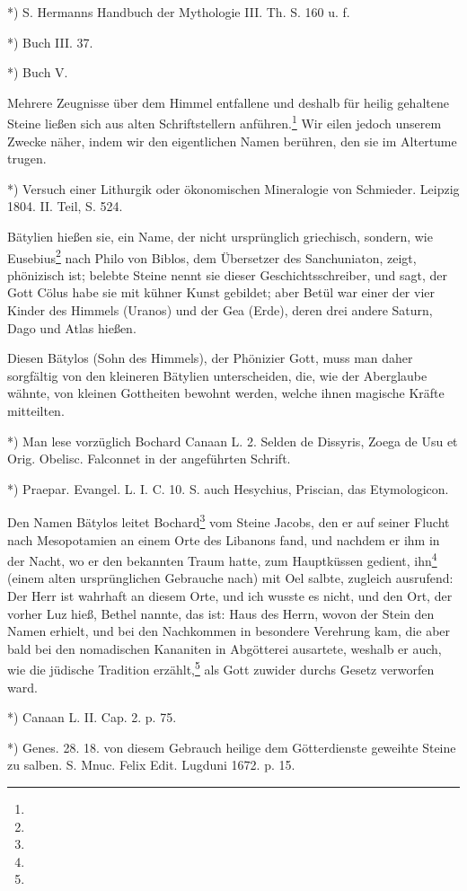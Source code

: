 \documentclass[a4paper, 11pt, oneside, polutonikogreek, german]{article}
\begin{document}
*) S. Hermanns Handbuch der Mythologie III. Th. S. 160 u. f.

*) Buch III. 37.

*) Buch V.

Mehrere Zeugnisse über dem Himmel entfallene und deshalb für heilig gehaltene Steine ließen sich aus alten Schriftstellern anführen.\footnote{} Wir eilen jedoch unserem Zwecke näher, indem wir den eigentlichen Namen berühren, den sie im Altertume trugen.

*) Versuch einer Lithurgik oder ökonomischen Mineralogie von Schmieder. Leipzig 1804. II. Teil, S. 524.

Bätylien hießen sie, ein Name, der nicht ursprünglich griechisch, sondern, wie Eusebius\footnote{} nach Philo von Biblos, dem Übersetzer des Sanchuniaton, zeigt, phönizisch ist; belebte Steine nennt sie dieser Geschichtsschreiber, und sagt, der Gott Cölus habe sie mit kühner Kunst gebildet; aber Betül war einer der vier Kinder des Himmels (Uranos) und der Gea (Erde), deren drei andere Saturn, Dago und Atlas hießen.

Diesen Bätylos (Sohn des Himmels), der Phönizier Gott, muss man daher sorgfältig von den kleineren Bätylien unterscheiden, die, wie der Aberglaube wähnte, von kleinen Gottheiten bewohnt werden, welche ihnen magische Kräfte mitteilten.

*) Man lese vorzüglich Bochard Canaan L. 2. Selden de Dissyris, Zoega de Usu et Orig. Obelisc. Falconnet in der angeführten Schrift.

*) Praepar. Evangel. L. I. C. 10. S. auch Hesychius, Priscian, das Etymologicon.

Den Namen Bätylos leitet Bochard\footnote{} vom Steine Jacobs, den er auf seiner Flucht nach Mesopotamien an einem Orte des Libanons fand, und nachdem er ihm in der Nacht, wo er den bekannten Traum hatte, zum Hauptküssen gedient, ihn\footnote{} (einem alten ursprünglichen Gebrauche nach) mit Oel salbte, zugleich ausrufend: Der Herr ist wahrhaft an diesem Orte, und ich wusste es nicht, und den Ort, der vorher Luz hieß, Bethel nannte, das ist: Haus des Herrn, wovon der Stein den Namen erhielt, und bei den Nachkommen in besondere Verehrung kam, die aber bald bei den nomadischen Kananiten in Abgötterei ausartete, weshalb er auch, wie die jüdische Tradition erzählt,\footnote{} als Gott zuwider durchs Gesetz verworfen ward.

*) Canaan L. II. Cap. 2. p. 75.

*) Genes. 28. 18. von diesem Gebrauch heilige dem Götterdienste geweihte Steine zu salben. S. Mnuc. Felix Edit. Lugduni 1672. p. 15.
\end{document}
